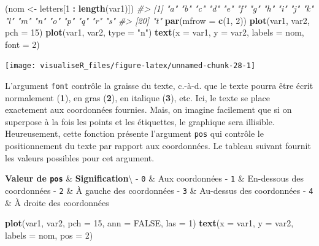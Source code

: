 \documentclass[]{article}
\newenvironment{Shaded}{\begin{snugshade}}{\end{snugshade}}
\newcommand{\CommentTok}[1]{\textcolor[rgb]{0.56,0.35,0.01}{\textit{#1}}}
\newcommand{\DataTypeTok}[1]{\textcolor[rgb]{0.13,0.29,0.53}{#1}}
\newcommand{\DecValTok}[1]{\textcolor[rgb]{0.00,0.00,0.81}{#1}}
\newcommand{\KeywordTok}[1]{\textcolor[rgb]{0.13,0.29,0.53}{\textbf{#1}}}
\newcommand{\NormalTok}[1]{#1}
\newcommand{\OperatorTok}[1]{\textcolor[rgb]{0.81,0.36,0.00}{\textbf{#1}}}
\newcommand{\OtherTok}[1]{\textcolor[rgb]{0.56,0.35,0.01}{#1}}
\newcommand{\StringTok}[1]{\textcolor[rgb]{0.31,0.60,0.02}{#1}}
\begin{document}
\begin{Shaded}
\begin{Highlighting}[]
\NormalTok{(nom <-}\StringTok{ }\NormalTok{letters[}\DecValTok{1} \OperatorTok{:}\StringTok{ }\KeywordTok{length}\NormalTok{(var1)])}
\CommentTok{#>  [1] "a" "b" "c" "d" "e" "f" "g" "h" "i" "j" "k" "l" "m" "n" "o" "p" "q" "r" "s"}
\CommentTok{#> [20] "t"}
\KeywordTok{par}\NormalTok{(}\DataTypeTok{mfrow =} \KeywordTok{c}\NormalTok{(}\DecValTok{1}\NormalTok{, }\DecValTok{2}\NormalTok{))}
\KeywordTok{plot}\NormalTok{(var1, var2, }\DataTypeTok{pch =} \DecValTok{15}\NormalTok{)}
\KeywordTok{plot}\NormalTok{(var1, var2, }\DataTypeTok{type =} \StringTok{"n"}\NormalTok{)}
\KeywordTok{text}\NormalTok{(}\DataTypeTok{x =}\NormalTok{ var1, }\DataTypeTok{y =}\NormalTok{ var2, }\DataTypeTok{labels =}\NormalTok{ nom, }\DataTypeTok{font =} \DecValTok{2}\NormalTok{)}
\end{Highlighting}
\end{Shaded}

\begin{center}\texttt{[image: visualiseR\_files/figure-latex/unnamed-chunk-28-1]} \end{center}

L'argument \texttt{font} contrôle la graisse du texte, c.-à-d. que le texte pourra être écrit normalement (\textbf{1}), en gras (\textbf{2}), en italique (\textbf{3}), etc. Ici, le texte se place exactement aux coordonnées fournies. Mais, on imagine facilement que si on superpose à la fois les points et les étiquettes, le graphique sera illisible. Heureusement, cette fonction présente l'argument \texttt{pos} qui contrôle le positionnement du texte par rapport aux coordonnées. Le tableau suivant fournit les valeurs possibles pour cet argument.

\textbf{Valeur de \texttt{pos}} \& \textbf{Signification}\textbackslash{}
- \texttt{0} \& Aux coordonnées
- \texttt{1} \& En-dessous des coordonnées
- \texttt{2} \& À gauche des coordonnées
- \texttt{3} \& Au-dessus des coordonnées
- \texttt{4} \& À droite des coordonnées

\begin{Shaded}
\begin{Highlighting}[]
\KeywordTok{plot}\NormalTok{(var1, var2, }\DataTypeTok{pch =} \DecValTok{15}\NormalTok{, }\DataTypeTok{ann =} \OtherTok{FALSE}\NormalTok{, }\DataTypeTok{las =} \DecValTok{1}\NormalTok{)}
\KeywordTok{text}\NormalTok{(}\DataTypeTok{x =}\NormalTok{ var1, }\DataTypeTok{y =}\NormalTok{ var2, }\DataTypeTok{labels =}\NormalTok{ nom, }\DataTypeTok{pos =} \DecValTok{2}\NormalTok{)}
\end{Highlighting}
\end{Shaded}
\end{document}
